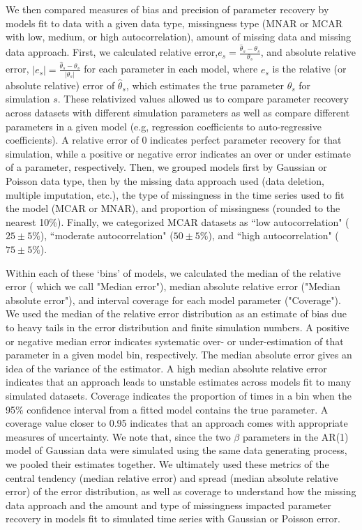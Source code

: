 \documentclass{article}
\begin{document}
We then compared measures of bias and precision of parameter recovery by models fit to data with a given data type, missingness type (MNAR or MCAR with low, medium, or high autocorrelation), amount of missing data and missing data approach. First, we calculated relative error,$e_s = \frac{\hat{\theta}_s - \theta_s}{\theta_s}$, and absolute relative error, $|e_s| = \frac{\hat{\theta}_s - \theta_s}{|\theta_s|}$ for each parameter in each model, where $e_s$ is the relative (or absolute relative) error of $\hat \theta_s$, which estimates the true parameter $\theta_s$ for simulation $s$. These relativized values allowed us to compare parameter recovery across datasets with different simulation parameters as well as compare different parameters in a given model (e.g, regression coefficients to auto-regressive coefficients). A relative error of 0 indicates perfect parameter recovery for that simulation, while a positive or negative error indicates an over or under estimate of a parameter, respectively. Then, we grouped models first by Gaussian or Poisson data type, then by the missing data approach used (data deletion, multiple imputation, etc.), the type of missingness in the time series used to fit the model (MCAR or MNAR), and proportion of missingness (rounded to the nearest 10\%). Finally, we categorized MCAR datasets as ``low autocorrelation" ($25 \pm 5\%$), ``moderate autocorrelation" ($50 \pm 5\%$), and ``high autocorrelation" ($75 \pm 5\%$).

Within each of these `bins' of models, we calculated the median of the relative error ( which we call "Median error"), median absolute relative error ("Median absolute error"), and interval coverage for each model parameter ("Coverage"). We used the median of the relative error distribution as an estimate of bias due to heavy tails in the error distribution and finite simulation numbers. A positive or negative median error indicates systematic over- or under-estimation of that parameter in a given model bin, respectively. The median absolute error gives an idea of the variance of the estimator. A high median absolute relative error indicates that an approach leads to unstable estimates across models fit to many simulated datasets. Coverage indicates the proportion of times in a bin when the 95\% confidence interval from a fitted model contains the true parameter. A coverage value closer to 0.95 indicates that an approach comes with appropriate measures of uncertainty. We note that, since the two $\beta$ parameters in the AR(1) model of Gaussian data were simulated using the same data generating process, we pooled their estimates together. We ultimately used these metrics of the central tendency (median relative error) and spread (median absolute relative error) of the error distribution, as well as coverage to understand how the missing data approach and the amount and type of missingness impacted parameter recovery in models fit to simulated time series with Gaussian or Poisson error.
\end{document}
